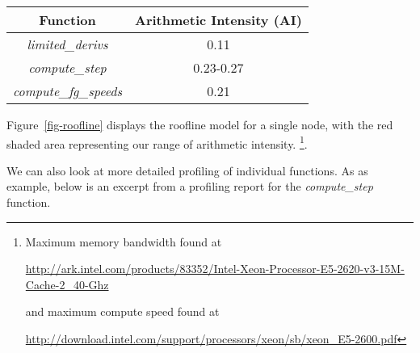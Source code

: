 \begin{center}
\begin{tabular}{ |c|c| } 
 \hline
 Function & Arithmetic Intensity (AI) \\ 
 \hline
 \emph{limited\_derivs} & 0.11 \\ 
 \emph{compute\_step} & 0.23-0.27 \\ 
 \emph{compute\_fg\_speeds} & 0.21 \\ 
 \hline
\end{tabular}
\end{center}

Figure~\ref{fig-roofline} displays the roofline model for a single node, with the red
shaded area representing our range of arithmetic intensity.
\footnote{Maximum memory bandwidth found at 

\url{http://ark.intel.com/products/83352/Intel-Xeon-Processor-E5-2620-v3-15M-Cache-2_40-Ghz} 

and maximum compute speed found at 

\url{http://download.intel.com/support/processors/xeon/sb/xeon_E5-2600.pdf}}.



We can also look at more detailed profiling of individual functions.
As as example, below is an excerpt from a profiling report for the 
\emph{compute\_step} function.

